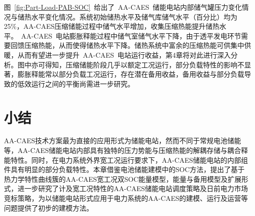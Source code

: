 图~\ref{fig:Part-Load-PAB-SOC}~给出了~AA-CAES~储能电站内部储气罐压力变化情况与储热水平变化情况。系统初始储热水平及储气库储气水平（百分比）均为25\%，AA-CAES压缩储能过程中储气水平增加，收集压缩热能提升储热水平。~AA-CAES~电站膨胀释能过程中储气室储气水平下降，由于透平发电环节需要回馈压缩热能，从而使得储热水平下降。储热系统中富余的压缩热能可供集中供暖，从而有望进一步提升~AA-CAES~电站运行收益，第4章将对此进行深入分析。图中亦可得知，压缩储能阶段几乎以额定工况运行，部分负载特性的影响不显著，膨胀释能常以部分负载工况运行，存在潜在备用收益，备用收益与部分负载导致的低效运行之间的平衡尚需进一步研究。

\section{小结}
AA-CAES技术方案最为直接的应用形式为储能电站，然而不同于常规电池储能等，AA-CAES储能电站内部具有独特的压力势能与压缩热能的解耦存储与耦合释能特性。同时，在电力系统外界宽工况运行要求下，AA-CAES储能电站的内部组件具有明显的部分负载特性。本章借鉴电池储能建模中的SOC方法，提出了基于热力学特性曲线簇的AA-CAES宽工况双SOC能量模型，能量与备用模型及扩展形式，进一步研究了计及宽工况特性的AA-CAES储能电站调度策略及日前电力市场竞标策略，为以储能电站形式应用于电力系统的AA-CAES的建模、运行及运营等问题提供了初步的建模方法。
